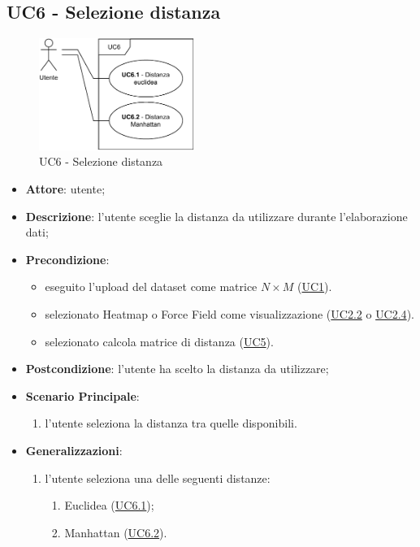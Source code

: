 \subsection{UC6 - Selezione distanza}
\label{uc6}

    \begin{figure}[htbp]
        \centering
        \includegraphics[width=0.45\textwidth]{source/sections/casi-uso/diagrams/uc6.pdf}
        \caption{UC6 - Selezione distanza}
        \label{fig:uc6}
    \end{figure}
    
    \begin{itemize}
    \item \textbf{Attore}: utente;
    \item \textbf{Descrizione}: l'utente sceglie la distanza da utilizzare durante l'elaborazione dati;
    \item \textbf{Precondizione}: 
    \begin{itemize}
        \item eseguito l'upload del dataset come matrice $N\times M$ (\hyperref[uc1]{UC1}).
        \item selezionato Heatmap o Force Field come visualizzazione (\hyperref[uc2.2]{UC2.2} o \hyperref[uc2.4]{UC2.4}).
        \item selezionato calcola matrice di distanza (\hyperref[uc5]{UC5}).
    \end{itemize}  
    \item \textbf{Postcondizione}: l'utente ha scelto la distanza da utilizzare;
    \item \textbf{Scenario Principale}: 
    \begin{enumerate}
        \item l'utente seleziona la distanza tra quelle disponibili.
    \end{enumerate}
    \item \textbf{Generalizzazioni}:
        \begin{enumerate}
            \item l'utente seleziona una delle seguenti distanze:
                \begin{enumerate}
                    \item Euclidea (\hyperref[uc6.1]{UC6.1});
                    \item Manhattan (\hyperref[uc6.2]{UC6.2}).
                \end{enumerate}
        \end{enumerate}  
    \end{itemize}
    
